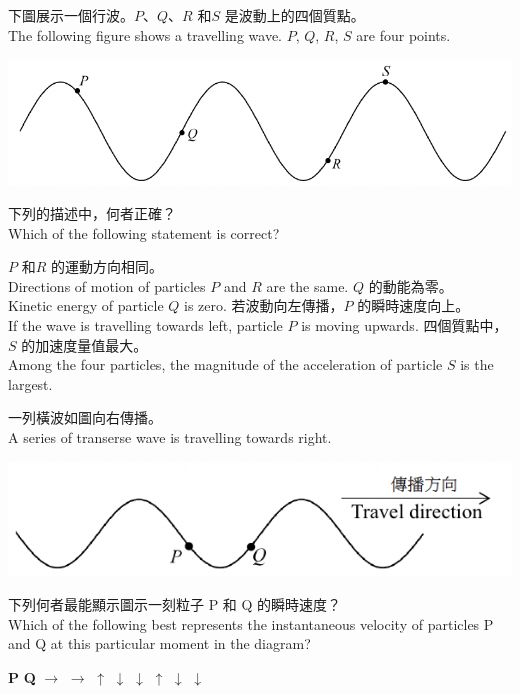 {
    下圖展示一個行波。$P$、$Q$、$R$ 和$S$ 是波動上的四個質點。\\The following figure shows a travelling wave. $P$, $Q$, $R$, $S$ are four points.
    \par{\par\centering\includegraphics[width=.6\textwidth]{./img/ch1_weekend_wave_mc_2024-05-16-14-32-33.png}\par}
    下列的描述中，何者正確？\\Which of the following statement is correct?
    \begin{tasks}
        \task $P$ 和$R$ 的運動方向相同。\\Directions of motion of particles $P$ and $R$ are the same.
        \task $Q$ 的動能為零。\\Kinetic energy of particle $Q$ is zero.
        \task 若波動向左傳播，$P$ 的瞬時速度向上。\\If the wave is travelling towards left, particle $P$ is moving upwards.
        \task 四個質點中，$S$ 的加速度量值最大。\\Among the four particles, the magnitude of the acceleration of particle $S$ is the largest.
    \end{tasks}

}{}

{
    一列橫波如圖向右傳播。\\A series of transerse wave is travelling towards right.
    \par{\par\centering\includegraphics[width=.6\textwidth]{./img/ch1_weekend_wave_mc_2024-05-16-14-40-55.png}\par}
    下列何者最能顯示圖示一刻粒子 P 和 Q 的瞬時速度？\\Which of the following best represents the instantaneous velocity of particles P and Q at this particular moment in the diagram?
    \begin{tasks}
        \task [] \textbf{P} \tab\tab \textbf{Q}
        \task $\rightarrow $ \tab\tab $\rightarrow $
        \task $\uparrow $ \tab\tab $\downarrow $
        \task $\downarrow $ \tab\tab $\uparrow $
        \task $\downarrow $ \tab\tab $\downarrow $
    \end{tasks}

}{}

